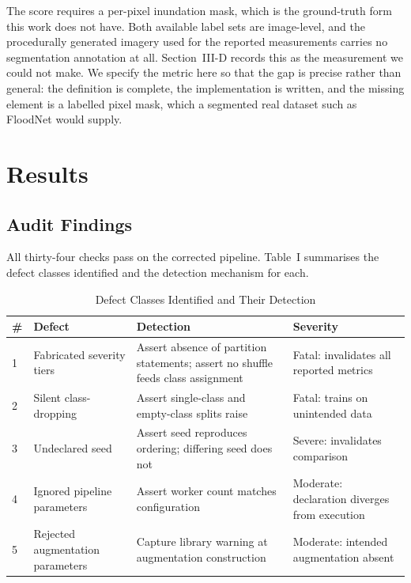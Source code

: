 \documentclass[11pt,journal]{IEEEtran}
\begin{document}
The score requires a per-pixel inundation mask, which is the ground-truth form
this work does not have. Both available label sets are image-level, and the
procedurally generated imagery used for the reported measurements carries no
segmentation annotation at all. Section~III-D records this as the measurement
we could not make. We specify the metric here so that the gap is precise rather
than general: the definition is complete, the implementation is written, and the
missing element is a labelled pixel mask, which a segmented real dataset such
as FloodNet would supply.

\section{Results}
\label{sec:results}

\subsection{Audit Findings}

All thirty-four checks pass on the corrected pipeline. Table~I summarises the
defect classes identified and the detection mechanism for each.

\begin{table}[!t]
\caption{Defect Classes Identified and Their Detection}
\label{tab:defects}
\centering
\begin{tabular}{@{}p{0.8cm}p{3.1cm}p{6.5cm}p{5.3cm}@{}}
\toprule
\textbf{\#} & \textbf{Defect} & \textbf{Detection} & \textbf{Severity} \\
\midrule
1 & Fabricated severity tiers &
Assert absence of partition statements; assert no shuffle feeds class
assignment &
Fatal: invalidates all reported metrics \\
2 & Silent class-dropping &
Assert single-class and empty-class splits raise &
Fatal: trains on unintended data \\
3 & Undeclared seed &
Assert seed reproduces ordering; differing seed does not &
Severe: invalidates comparison \\
4 & Ignored pipeline parameters &
Assert worker count matches configuration &
Moderate: declaration diverges from execution \\
5 & Rejected augmentation parameters &
Capture library warning at augmentation construction &
Moderate: intended augmentation absent \\
\bottomrule
\end{tabular}
\end{table}
\end{document}
